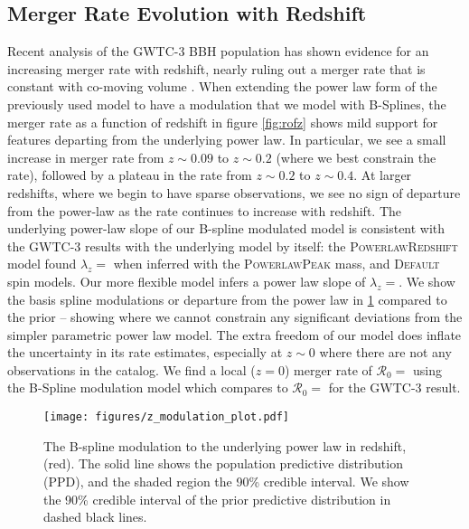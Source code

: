 \subsection{Merger Rate Evolution with Redshift} \label{sec:redshift}

Recent analysis of the GWTC-3 BBH population has shown evidence for an increasing merger rate with redshift, nearly ruling out a merger rate that is 
constant with co-moving volume \citep{Fishbach_2018redshift,o3b_astro_dist}. When extending the power law form of the previously used model to have a modulation 
that we model with B-Splines, the merger rate as a function of redshift in figure \ref{fig:rofz} shows mild support for features departing from the underlying power law. 
In particular, we see a small increase in merger rate from $z\sim0.09$ to $z\sim0.2$ (where we best constrain the rate), followed by a plateau in the rate from $z\sim0.2$ to $z\sim0.4$. 
At larger redshifts, where we begin to have sparse observations, we see no sign of departure from the power-law as the rate continues to increase with redshift. 
The underlying power-law slope of our B-spline modulated model is consistent with the GWTC-3 results with the underlying model by itself: the \textsc{PowerlawRedshift} model 
found $\lambda_z = $\result{$\CIPlusMinus{\macros[PLPeak][lamb]}$} when inferred with the \textsc{PowerlawPeak} mass, and \textsc{Default} spin models. Our more 
flexible model infers a power law slope of $\lambda_z = $\result{$\CIPlusMinus{\macros[BSplineIIDCompSpins][lamb]}$}. We show the basis spline modulations or departure 
from the power law in \ref{fig:z_modulation} compared to the prior -- showing where we cannot constrain any significant deviations from the simpler parametric power law model. 
The extra freedom of our model does inflate the uncertainty in its rate estimates, especially at $z\sim0$ where there are not any observations in the catalog. 
We find a local ($z=0$) merger rate of $\mathcal{R}_0 = $ using the B-Spline modulation model 
which compares to $\mathcal{R}_0 = $ for the GWTC-3 result. 

\begin{figure}[ht!]
    \texttt{[image: figures/z\_modulation\_plot.pdf]}
    \caption{The B-spline modulation to the underlying power law in redshift, (red). The solid line shows the population predictive distribution (PPD),
    and the shaded region the 90\% credible interval. We show the 90\% credible interval of the prior predictive distribution in dashed black lines.}
    \label{fig:z_modulation}
\end{figure}
